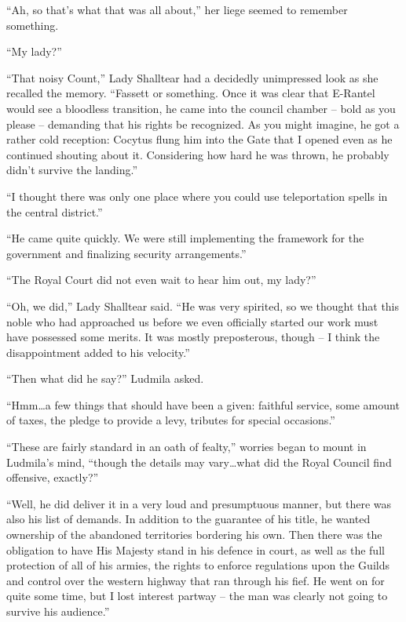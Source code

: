  

“Ah, so that’s what that was all about,” her liege seemed to remember something.

 

“My lady?”

 

“That noisy Count,” Lady Shalltear had a decidedly unimpressed look as she recalled the memory. “Fassett or something. Once it was clear that E-Rantel would see a bloodless transition, he came into the council chamber – bold as you please – demanding that his rights be recognized. As you might imagine, he got a rather cold reception: Cocytus flung him into the Gate that I opened even as he continued shouting about it. Considering how hard he was thrown, he probably didn’t survive the landing.”

 

“I thought there was only one place where you could use teleportation spells in the central district.”

 

“He came quite quickly. We were still implementing the framework for the government and finalizing security arrangements.”

 

“The Royal Court did not even wait to hear him out, my lady?”

 

“Oh, we did,” Lady Shalltear said. “He was very spirited, so we thought that this noble who had approached us before we even officially started our work must have possessed some merits. It was mostly preposterous, though – I think the disappointment added to his velocity.”

 

“Then what did he say?” Ludmila asked.

 

“Hmm…a few things that should have been a given: faithful service, some amount of taxes, the pledge to provide a levy, tributes for special occasions.”

 

“These are fairly standard in an oath of fealty,” worries began to mount in Ludmila’s mind, “though the details may vary…what did the Royal Council find offensive, exactly?”

 

“Well, he did deliver it in a very loud and presumptuous manner, but there was also his list of demands. In addition to the guarantee of his title, he wanted ownership of the abandoned territories bordering his own. Then there was the obligation to have His Majesty stand in his defence in court, as well as the full protection of all of his armies, the rights to enforce regulations upon the Guilds and control over the western highway that ran through his fief. He went on for quite some time, but I lost interest partway – the man was clearly not going to survive his audience.”

